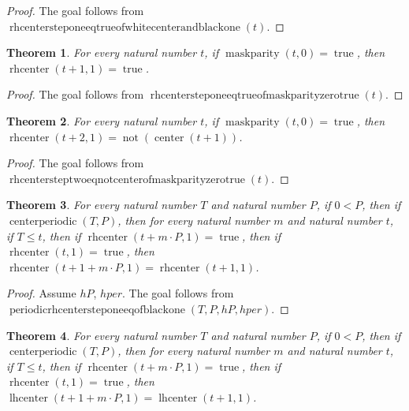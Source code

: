 \documentclass[11pt]{article}
\newtheorem{theorem}{Theorem}[section]
\theoremstyle{definition}
\begin{document}
\begin{proof}
The goal follows from \(\operatorname{rhcentersteponeeqtrueofwhitecenterandblackone}(t)\).
\end{proof}
\begin{theorem}
\label{ll:paper:rhcenter-step-one-eq-true-of-maskparity-zero-true}
For every natural number \(t\), if \(\operatorname{maskparity}(t, 0) = \operatorname{true}\), then \(\operatorname{rhcenter}(t + 1, 1) = \operatorname{true}\).
\end{theorem}
\begin{proof}
The goal follows from \(\operatorname{rhcentersteponeeqtrueofmaskparityzerotrue}(t)\).
\end{proof}
\begin{theorem}
\label{ll:paper:rhcenter-step-two-eq-not-center-of-maskparity-zero-true}
For every natural number \(t\), if \(\operatorname{maskparity}(t, 0) = \operatorname{true}\), then \(\operatorname{rhcenter}(t + 2, 1) = \operatorname{not}(\operatorname{center}(t + 1))\).
\end{theorem}
\begin{proof}
The goal follows from \(\operatorname{rhcentersteptwoeqnotcenterofmaskparityzerotrue}(t)\).
\end{proof}
\begin{theorem}
\label{ll:paper:periodic-rhcenter-step-one-eq-of-black-one}
For every natural number \(T\) and natural number \(P\), if \(0 < P\), then if \(\operatorname{centerperiodic}(T, P)\), then for every natural number \(m\) and natural number \(t\), if \(T \le t\), then if \(\operatorname{rhcenter}(t + m \cdot P, 1) = \operatorname{true}\), then if \(\operatorname{rhcenter}(t, 1) = \operatorname{true}\), then \(\operatorname{rhcenter}(t + 1 + m \cdot P, 1) = \operatorname{rhcenter}(t + 1, 1)\).
\end{theorem}
\begin{proof}
Assume \(hP\), \(hper\).
The goal follows from \(\operatorname{periodicrhcentersteponeeqofblackone}(T, P, hP, hper)\).
\end{proof}
\begin{theorem}
\label{ll:paper:periodic-lhcenter-step-one-eq-of-black-one}
For every natural number \(T\) and natural number \(P\), if \(0 < P\), then if \(\operatorname{centerperiodic}(T, P)\), then for every natural number \(m\) and natural number \(t\), if \(T \le t\), then if \(\operatorname{rhcenter}(t + m \cdot P, 1) = \operatorname{true}\), then if \(\operatorname{rhcenter}(t, 1) = \operatorname{true}\), then \(\operatorname{lhcenter}(t + 1 + m \cdot P, 1) = \operatorname{lhcenter}(t + 1, 1)\).
\end{theorem}
\end{document}
